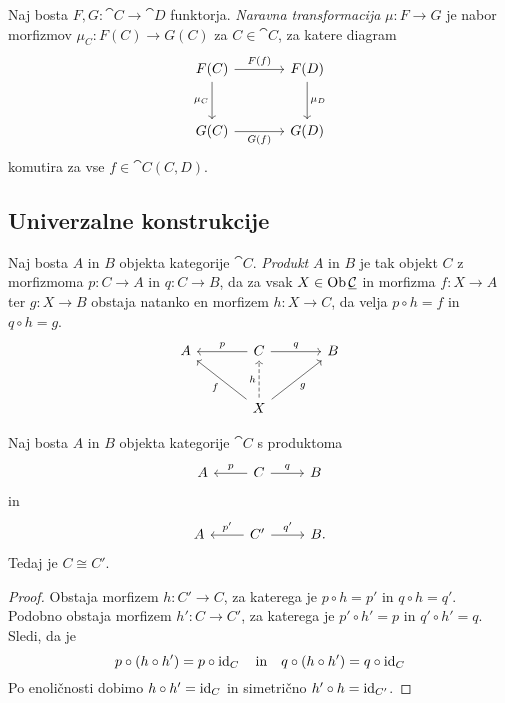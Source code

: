 \begin{definicija}
Naj bosta $F, G \colon \cat{C} \to \cat{D}$ funktorja.
\emph{Naravna transformacija}
$\mu \colon F \to G$ je nabor morfizmov
$\mu_C \colon F(C) \to G(C)$ za $C \in \cat{C}$, za katere
diagram
\[
\begin{tikzcd}[column sep=large, row sep=large]
F(C) \arrow[r, "F(f)"] \arrow[d, "\mu_C"'] &
F(D) \arrow[d, "\mu_D"] \\
G(C) \arrow[r, "G(f)"'] & G(D)
\end{tikzcd}
\]
komutira za vse $f \in \cat{C}(C,D)$.
\end{definicija}

\newpage

\subsection{Univerzalne konstrukcije}

\begin{definicija}
Naj bosta $A$ in $B$ objekta kategorije $\cat{C}$.
\emph{Produkt} $A$ in $B$ je tak objekt
$C$ z morfizmoma $p \colon C \to A$ in $q \colon C \to B$, da za
vsak $X \in \operatorname{Ob} \underline{\mathcal{C}}$ in morfizma $f \colon X \to A$ ter
$g \colon X \to B$ obstaja natanko en morfizem $h \colon X \to C$,
da velja $p \circ h = f$ in $q \circ h = g$.
\[
\begin{tikzcd}[column sep=large, row sep=large]
A & C \arrow[l, "p"'] \arrow[r, "q"] & B \\
  & X \arrow[ul, "f"] \arrow[ur, "g"']
\arrow[u, dashrightarrow, "h"]
\end{tikzcd}
\]
\end{definicija}

\begin{trditev}
Naj bosta $A$ in $B$ objekta kategorije $\cat{C}$ s produktoma
\[
\begin{tikzcd}
A & C \arrow[l, "p"'] \arrow[r, "q"] & B
\end{tikzcd}
\]
in
\[
\begin{tikzcd}
A & C' \arrow[l, "p'"'] \arrow[r, "q'"] & B.
\end{tikzcd}
\]
Tedaj je $C \cong C'$.
\end{trditev}

\begin{proof}
Obstaja morfizem $h \colon C' \to C$, za katerega je
$p \circ h = p'$ in $q \circ h = q'$. Podobno obstaja morfizem
$h' \colon C \to C'$, za katerega je $p' \circ h' = p$ in
$q' \circ h' = q$. Sledi, da je
\[
p \circ (h \circ h') = p \circ \operatorname{id}_C
\quad \text{in} \quad
q \circ (h \circ h') = q \circ \operatorname{id}_C
\]
Po enoličnosti dobimo $h \circ h' = \operatorname{id}_C$ in simetrično
$h' \circ h = \operatorname{id}_{C'}$.
\end{proof}

